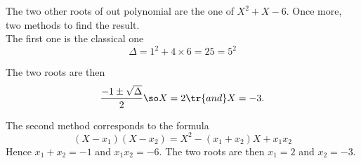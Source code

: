 {The two other roots of out polynomial are the one of $X^2+X-6$. Once more, two methods to find the result. \\

The first one is the classical one
\begin{equation}
	\Delta=1^2+4\times 6=25=5^2
\end{equation}

The two roots are then
\begin{equation}
	\dfrac{-1\pm\sqrt{\Delta}}{2}\so X=2 \tr{ and } X=-3.
\end{equation}

The second method corresponds to the formula
\begin{equation}
	(X-x_1)(X-x_2)=X^2-(x_1+x_2)X+x_1x_2
\end{equation}
Hence $x_1+x_2=-1$ and $x_1x_2=-6$. The two roots are then $x_1=2$ and $x_2=-3$.

}